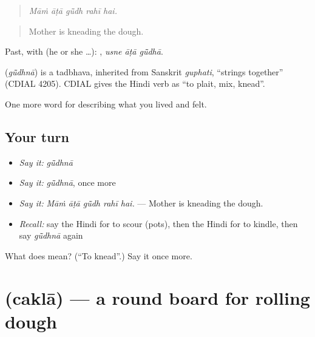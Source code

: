 \begin{quote}
    
\end{quote}

\begin{quote}
\emph{Māṁ āṭā gū̃dh rahī hai.}
\end{quote}

\begin{quote}
Mother is kneading the dough.
\end{quote}

Past, with  (he or she …):   , \emph{usne āṭā gū̃dhā}.

\begin{cousinweb}
\textbf{} (\emph{gū̃dhnā}) is a tadbhava, inherited from Sanskrit \emph{guphati}, \textquotedblleft{}strings together\textquotedblright{} (CDIAL 4205). CDIAL gives the Hindi verb as \textquotedblleft{}to plait, mix, knead\textquotedblright{}.
\end{cousinweb}

\begin{grammarlens}[title={What you've built}]
One more word for describing what you lived and felt.
\end{grammarlens}

\subsection*{Your turn}
\begin{itemize}
\raggedright
  \item \emph{Say it:} \emph{gū̃dhnā}
  \item \emph{Say it:} \emph{gū̃dhnā}, once more
  \item \emph{Say it:} \emph{Māṁ āṭā gū̃dh rahī hai.} — Mother is kneading the dough.
  \item \emph{Recall:} say the Hindi for to scour (pots), then the Hindi for to kindle, then say \emph{gū̃dhnā} again
\end{itemize}

\begin{tcolorbox}[breakable,colback=teal!4,colframe=teal!35!black,title={Before you move on}]
What does  mean? (\textquotedblleft{}To knead\textquotedblright{}.) Say it once more.
\end{tcolorbox}
\section[\texorpdfstring{\hi{चकला} (caklā)}{चकला (caklā)}]{ (caklā) — a round board for rolling dough}

